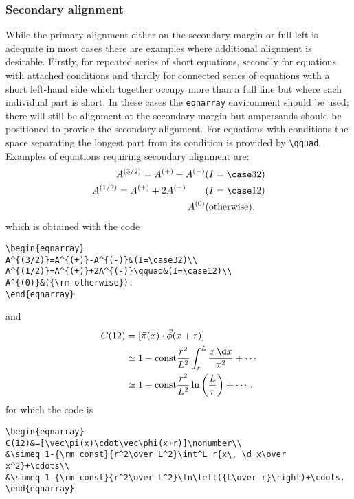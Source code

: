 \subsubsection{Secondary alignment}
While the primary alignment either on the secondary
margin or full left is adequate in most cases
there are examples where additional
alignment is desirable. Firstly, for repeated series of short
equations, secondly for
equations with attached conditions and thirdly for connected
series of equations with a short left-hand side which together
occupy more than a full line but where each individual
part is short. In these cases the \verb"eqnarray" environment
should be used; there will still be alignment at the
secondary margin but ampersands should be positioned to
provide the secondary alignment. For equations with conditions the
space separating the longest part from its condition is provided by
\verb"\qquad". Examples of equations requiring secondary alignment are:
\begin{eqnarray}
A^{(3/2)}=A^{(+)}-A^{(-)}&(I=\case32)\\
A^{(1/2)}=A^{(+)}+2A^{(-)}\qquad&(I=\case12)\\
A^{(0)}&({\rm otherwise}).
\end{eqnarray}
which is obtained with the code
\begin{verbatim}
\begin{eqnarray}
A^{(3/2)}=A^{(+)}-A^{(-)}&(I=\case32)\\
A^{(1/2)}=A^{(+)}+2A^{(-)}\qquad&(I=\case12)\\
A^{(0)}&({\rm otherwise}).
\end{eqnarray}
\end{verbatim}
and
\begin{eqnarray}
C(12)&=[\vec\pi(x)\cdot\vec\phi(x+r)]\nonumber\\
&\simeq 1-{\rm const}{r^2\over L^2}\int^L_r{x\, \d x\over
x^2}+\cdots\\
&\simeq 1-{\rm const}{r^2\over L^2}\ln\left({L\over r}\right)+\cdots.
\end{eqnarray}
for which the code is
\begin{verbatim}
\begin{eqnarray}
C(12)&=[\vec\pi(x)\cdot\vec\phi(x+r)]\nonumber\\
&\simeq 1-{\rm const}{r^2\over L^2}\int^L_r{x\, \d x\over
x^2}+\cdots\\
&\simeq 1-{\rm const}{r^2\over L^2}\ln\left({L\over r}\right)+\cdots.
\end{eqnarray}
\end{verbatim}

